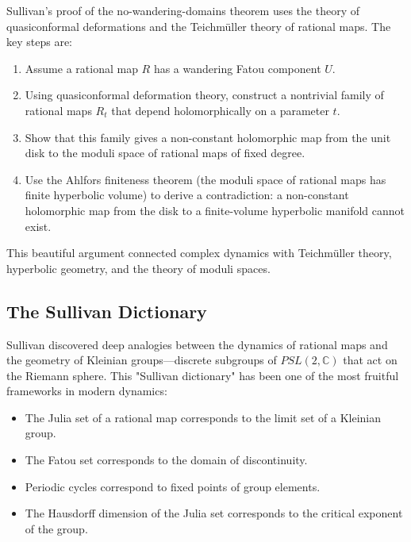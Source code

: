 Sullivan's proof of the no-wandering-domains theorem uses the theory of quasiconformal deformations and the Teichm\"uller theory of rational maps. The key steps are:

\begin{enumerate}
\item Assume a rational map $R$ has a wandering Fatou component $U$.
\item Using quasiconformal deformation theory, construct a nontrivial family of rational maps $R_t$ that depend holomorphically on a parameter $t$.
\item Show that this family gives a non-constant holomorphic map from the unit disk to the moduli space of rational maps of fixed degree.
\item Use the Ahlfors finiteness theorem (the moduli space of rational maps has finite hyperbolic volume) to derive a contradiction: a non-constant holomorphic map from the disk to a finite-volume hyperbolic manifold cannot exist.
\end{enumerate}

This beautiful argument connected complex dynamics with Teichm\"uller theory, hyperbolic geometry, and the theory of moduli spaces.

\subsection{The Sullivan Dictionary}

Sullivan discovered deep analogies between the dynamics of rational maps and the geometry of Kleinian groups---discrete subgroups of $PSL(2, \mathbb{C})$ that act on the Riemann sphere. This "Sullivan dictionary" has been one of the most fruitful frameworks in modern dynamics:

\begin{itemize}
\item The Julia set of a rational map corresponds to the limit set of a Kleinian group.
\item The Fatou set corresponds to the domain of discontinuity.
\item Periodic cycles correspond to fixed points of group elements.
\item The Hausdorff dimension of the Julia set corresponds to the critical exponent of the group.
\end{itemize}

